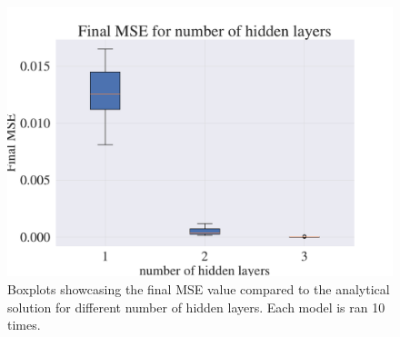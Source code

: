 \begin{figure}[h!]
    \centering
    \includegraphics[width=1.0\linewidth]{project_3/plots/n_layers_search.pdf}
    \caption{Boxplots showcasing the final MSE value compared to the analytical solution for different number of hidden layers. Each model is ran 10 times.}
    \label{fig:boxplots_number_of_hidden_layers}
\end{figure}

